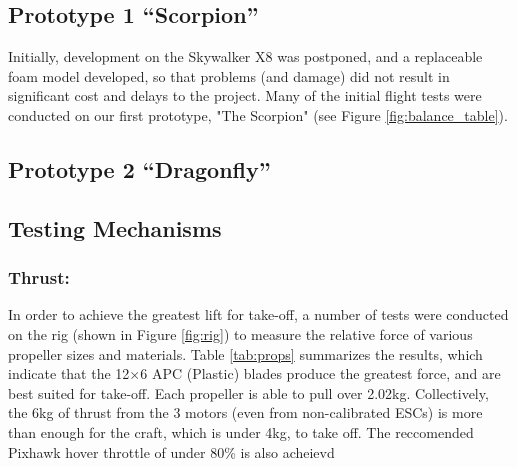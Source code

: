 
\subsection{Prototype 1 ``Scorpion''}
Initially, development on the Skywalker X8 was postponed, and a replaceable foam model developed, so that problems (and damage) did not result in significant cost and delays to the project. Many of the initial flight tests were conducted on our first prototype, "The Scorpion" (see Figure \ref{fig:balance_table}).

\subsection{Prototype 2 ``Dragonfly''}

\subsection{Testing Mechanisms}
\subsubsection*{Thrust:} In order to achieve the greatest lift for take-off, a number of tests were conducted on the rig (shown in Figure \ref{fig:rig}) to measure the relative force of various propeller sizes and materials. Table \ref{tab:props} summarizes the results, which indicate that the 12$\times$6 APC (Plastic) blades produce the greatest force, and are best suited for take-off. Each propeller is able to pull over 2.02kg. Collectively, the 6kg of thrust from the 3 motors (even from non-calibrated ESCs) is more than enough for the craft, which is under 4kg, to take off. The reccomended Pixhawk hover throttle of under 80\% is also acheievd  

